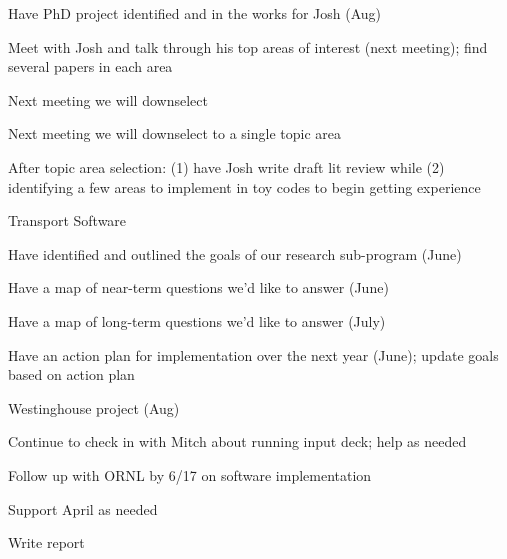 \documentclass[12pt,twoside]{article}
\begin{document}
\begin{compactitem}
\item Have PhD project identified and in the works for Josh (Aug)
  \begin{compactitem}
  \item Meet with Josh and talk through his top areas of interest (next meeting); find several papers in each area
  \item Next meeting we will downselect
  \item Next meeting we will downselect to a single topic area
  \item After topic area selection: (1) have Josh write draft lit review while (2) identifying a few areas to implement in toy codes to begin getting experience
  \end{compactitem}

\item Transport Software
  \begin{compactitem}
  \item Have identified and outlined the goals of our research sub-program (June)
  \item Have a map of near-term questions we'd like to answer (June)
  \item Have a map of long-term questions we'd like to answer (July)
  \item Have an action plan for implementation over the next year (June); update goals based on action plan
  \end{compactitem}
\item Westinghouse project (Aug)
  \begin{compactitem}
  \item Continue to check in with Mitch about running input deck; help as needed
  \item Follow up with ORNL by 6/17 on software implementation
  \item Support April as needed
  \item Write report
  \end{compactitem}
\end{compactitem}
\end{document}

